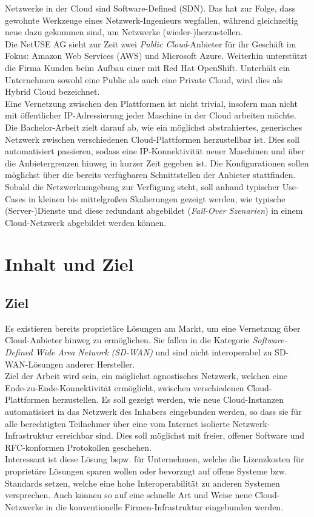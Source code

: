 Netzwerke in der Cloud sind Software-Defined (SDN)\cite{Seidel2015}. Das hat zur Folge, dass gewohnte Werkzeuge eines Netzwerk-Ingenieurs wegfallen, während gleichzeitig neue dazu gekommen sind, um Netzwerke (wieder-)herzustellen.\\
Die NetUSE AG sieht zur Zeit zwei \textit{Public Cloud}-Anbieter für ihr Geschäft im Fokus: Amazon Web Services (AWS) und Microsoft Azure. Weiterhin unterstützt die Firma Kunden beim Aufbau einer \grqq{} mit Red Hat OpenShift. Unterhält ein Unternehmen sowohl eine Public als auch eine Private Cloud, wird dies als Hybrid Cloud bezeichnet.\\
Eine Vernetzung zwischen den Plattformen ist nicht trivial, insofern man nicht mit öffentlicher IP-Adressierung jeder Maschine in der Cloud arbeiten möchte.
Die Bachelor-Arbeit zielt darauf ab, wie ein möglichst abstrahiertes, generisches Netzwerk zwischen verschiedenen Cloud-Plattformen herzustellbar ist. Dies soll automatisiert passieren, sodass eine IP-Konnektivität neuer Maschinen und \grqq{} über die Anbietergrenzen hinweg in kurzer Zeit gegeben ist. Die Konfigurationen sollen möglichst über die bereits verfügbaren Schnittstellen der Anbieter stattfinden. Sobald die Netzwerkumgebung zur Verfügung steht, soll anhand typischer Use-Cases in kleinen bis mittelgroßen Skalierungen gezeigt werden, wie typische (Server-)Dienste und diese redundant abgebildet (\textit{Fail-Over Szenarien}) in einem Cloud-Netzwerk abgebildet werden können.

\chapter{Inhalt und Ziel}
\section{Ziel}

Es existieren bereits proprietäre Lösungen am Markt, um eine Vernetzung über Cloud-Anbieter hinweg zu ermöglichen. Sie fallen in die Kategorie \textit{Software-Defined Wide Area Network (SD-WAN)} und sind nicht interoperabel zu SD-WAN-Lösungen anderer Hersteller.\\
Ziel der Arbeit wird sein, ein möglichst agnostisches Netzwerk, welchen eine Ende-zu-Ende-Konnektivität ermöglicht, zwischen verschiedenen Cloud-Plattformen herzustellen. Es soll gezeigt werden, wie neue Cloud-Instanzen automatisiert in das Netzwerk des Inhabers eingebunden werden, so dass sie für alle berechtigten Teilnehmer über eine vom Internet isolierte Netzwerk-Infrastruktur erreichbar sind. Dies soll möglichst mit freier, offener Software und RFC-konformen Protokollen geschehen.\\
Interessant ist diese Lösung bspw. für Unternehmen, welche die Lizenzkosten für proprietäre Lösungen sparen wollen oder bevorzugt auf offene Systeme bzw. Standards setzen, welche eine hohe Interoperabilität zu anderen Systemen versprechen. Auch können so auf eine schnelle Art und Weise neue Cloud-Netzwerke in die konventionelle Firmen-Infrastruktur eingebunden werden.

